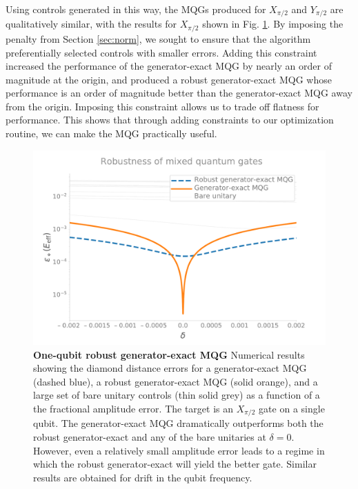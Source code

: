 \documentclass[aps,nofootinbib,pra,notitlepage,twocolumn]{revtex4-1}
\newcommand{\0}{\ensuremath{\mathbf{0}}}
\begin{document}
{Using controls generated in this way, the MQGs produced for $X_{\pi/2}$ and $Y_{\pi/2}$ are qualitatively similar, with the results for $X_{\pi/2}$ shown in Fig. \ref{fig:YMQG}. By imposing the penalty from Section \ref{sec:norm}, we sought to ensure that the algorithm preferentially selected controls with smaller errors. Adding this constraint increased the performance of the generator-exact MQG by nearly an order of magnitude at the origin, and produced a robust generator-exact MQG whose performance is an order of magnitude better than the generator-exact MQG away from the origin. Imposing this constraint allows us to trade off flatness for performance. This shows that through adding constraints to our optimization routine, we can make the MQG practically useful. 

\begin{figure}[h]
  \centering
  \includegraphics[width=\columnwidth]{1q_robustness_delta.pdf}
  \caption{\textbf{One-qubit robust generator-exact MQG} Numerical results showing the diamond distance errors for a generator-exact MQG (dashed blue), a robust generator-exact MQG (solid orange), and a large set of bare unitary controls (thin solid grey) as a function of a the fractional amplitude error. The target is an $X_{\pi/2}$ gate on a single qubit. The generator-exact MQG dramatically outperforms both the robust generator-exact and any of the bare unitaries at $\delta=0$. However, even a relatively small amplitude error leads to a regime in which the robust generator-exact will yield the better gate. Similar results are obtained for drift in the qubit frequency.}
  \label{fig:YMQG}
\end{figure}

}
\end{document}
